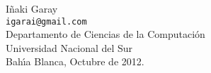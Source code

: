 % 

\vspace{5cm}

\begin{flushright}
I\~{n}aki Garay \\
{\small \tt igarai@gmail.com} \\
{\sc Departamento de Ciencias de la Computaci\'on \\
Universidad Nacional del Sur }\\
Bah\'{\i}a Blanca, Octubre de 2012. \\
\end{flushright}
